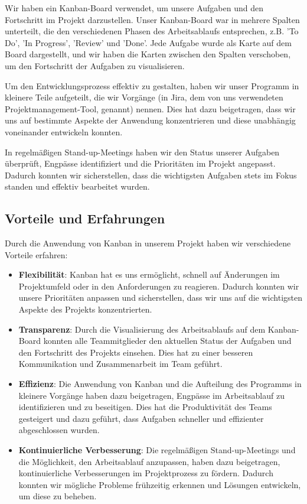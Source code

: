 \documentclass[a4paper]{article}
\begin{document}
Wir haben ein Kanban-Board verwendet, um unsere Aufgaben und den Fortschritt im Projekt darzustellen. Unser Kanban-Board war in mehrere Spalten unterteilt, die den verschiedenen Phasen des Arbeitsablaufs entsprechen, z.B. 'To Do', 'In Progress', 'Review' und 'Done'. Jede Aufgabe wurde als Karte auf dem Board dargestellt, und wir haben die Karten zwischen den Spalten verschoben, um den Fortschritt der Aufgaben zu visualisieren.

Um den Entwicklungsprozess effektiv zu gestalten, haben wir unser Programm in kleinere Teile aufgeteilt, die wir Vorgänge (in Jira, dem von uns verwendeten Projektmanagement-Tool, genannt) nennen. Dies hat dazu beigetragen, dass wir uns auf bestimmte Aspekte der Anwendung konzentrieren und diese unabhängig voneinander entwickeln konnten.

In regelmäßigen Stand-up-Meetings haben wir den Status unserer Aufgaben überprüft, Engpässe identifiziert und die Prioritäten im Projekt angepasst. Dadurch konnten wir sicherstellen, dass die wichtigsten Aufgaben stets im Fokus standen und effektiv bearbeitet wurden.

\subsection{Vorteile und Erfahrungen}

Durch die Anwendung von Kanban in unserem Projekt haben wir verschiedene Vorteile erfahren:

\begin{itemize}
	\item \textbf{Flexibilität}: Kanban hat es uns ermöglicht, schnell auf Änderungen im Projektumfeld oder in den Anforderungen zu reagieren. Dadurch konnten wir unsere Prioritäten anpassen und sicherstellen, dass wir uns auf die wichtigsten Aspekte des Projekts konzentrierten.
	\item \textbf{Transparenz}: Durch die Visualisierung des Arbeitsablaufs auf dem Kanban-Board konnten alle Teammitglieder den aktuellen Status der Aufgaben und den Fortschritt des Projekts einsehen. Dies hat zu einer besseren Kommunikation und Zusammenarbeit im Team geführt.
	\item \textbf{Effizienz}: Die Anwendung von Kanban und die Aufteilung des Programms in kleinere Vorgänge haben dazu beigetragen, Engpässe im Arbeitsablauf zu identifizieren und zu beseitigen. Dies hat die Produktivität des Teams gesteigert und dazu geführt, dass Aufgaben schneller und effizienter abgeschlossen wurden.
	\item \textbf{Kontinuierliche Verbesserung}: Die regelmäßigen Stand-up-Meetings und die Möglichkeit, den Arbeitsablauf anzupassen, haben dazu beigetragen, kontinuierliche Verbesserungen im Projektprozess zu fördern. Dadurch konnten wir mögliche Probleme frühzeitig erkennen und Lösungen entwickeln, um diese zu beheben.
\end{itemize}
\end{document}
